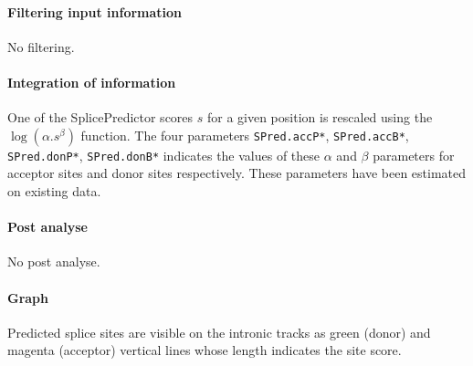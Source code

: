 \paragraph{Filtering input information}

No filtering.

\paragraph{Integration of information}

One of the SplicePredictor scores $s$ for a given position is
rescaled using the $\log(\alpha.s^\beta)$ function. The four parameters
\texttt{SPred.accP*}, \texttt{SPred.accB*}, \texttt{SPred.donP*},
\texttt{SPred.donB*} indicates the values of these $\alpha$ and $\beta$
parameters for acceptor sites and donor sites respectively.  These
parameters have been estimated on existing data.

\paragraph{Post analyse}

No post analyse.

\paragraph{Graph}

Predicted splice sites are visible on the intronic tracks as green
(donor) and magenta (acceptor) vertical lines whose length indicates
the site score.
